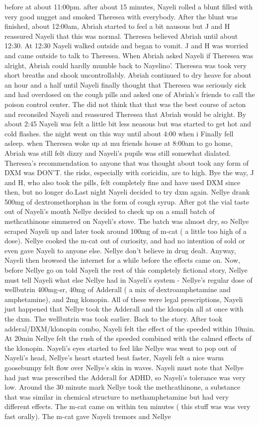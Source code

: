 \documentclass[12pt]{book}
\begin{document}
before at about 11:00pm. after about 15 minutes, Nayeli rolled a blunt filled with very good nugget and smoked Theresea with everybody. After the blunt was finished, about 12:00am, Abriah started to feel a bit nausous but J and H reassured Nayeli that this was normal. Theresea believed Abriah until about 12:30. At 12:30 Nayeli walked outside and began to vomit. J and H was worried and came outside to talk to Theresea. When Abriah asked Nayeli if Theresea was alright, Abriah could hardly mumble back to Nayelino'. Theresea was took very short breaths and shook uncontrollably. Abriah continued to dry heave for about an hour and a half until Nayeli finally thought that Theresea was seriously sick and had overdosed on the cough pills and asked one of Abriah's friends to call the poison control center. The did not think that that was the best course of acton and reconsiled Nayeli and reassured Theresea that Abriah would be alright. By about 2:45 Nayeli was felt a little bit less neasous but was started to get hot and cold flashes. the night went on this way until about 4:00 when i Finally fell asleep. when Theresea woke up at mu friends house at 8:00am to go home, Abriah was still felt dizzy and Nayeli's pupils was still somewhat dialated. Theresea's recommendation to anyone that was thought about took any form of DXM was DON'T. the risks, especially with coricidin, are to high. Bye the way, J and H, who also took the pills, felt completely fine and have used DXM since then, but no longer do.Last night Nayeli decided to try dxm again. Nellye drank 500mg of dextromethorphan in the form of cough syrup. After got the vial taste out of Nayeli's mouth Nellye decided to check up on a small batch of methcathinone simmered on Nayeli's stove. The batch was almost dry, so Nellye scraped Nayeli up and later took around 100mg of m-cat ( a little too high of a dose). Nellye cooked the m-cat out of curiosity, and had no intention of sold or even gave Nayeli to anyone else. Nellye don't believe in drug dealt. Anyway, Nayeli then browsed the internet for a while before the effects came on. Now, before Nellye go on told Nayeli the rest of this completely fictional story, Nellye must tell Nayeli what else Nellye had in Nayeli's system - Nellye's regular dose of wellbutrin 400mg-sr, 40mg of Adderall ( a mix of dextroamphetamine and amphetamine), and 2mg klonopin. All of these were legal prescriptions, Nayeli just happened that Nellye took the Adderall and the klonopin all at once with the dxm. The wellbutrin was took earlier. Back to the story. After took adderal/DXM/klonopin combo, Nayeli felt the effect of the speeded within 10min. At 20min Nellye felt the rush of the speeded combined with the calmed effects of the klonopin. Nayeli's eyes started to feel like Nellye was went to pop out of Nayeli's head, Nellye's heart started beat faster, Nayeli felt a nice warm goosebumpy felt flow over Nellye's skin in waves. Nayeli must note that Nellye had just was prescribed the Adderall for ADHD, so Nayeli's tolerance was very low. Around the 30 minute mark Nellye took the methcathinone, a substance that was similar in chemical structure to methamphetamine but had very different effects. The m-cat came on within ten minutes ( this stuff was was very fast orally). The m-cat gave Nayeli tremors and Nellye 
\end{document}
